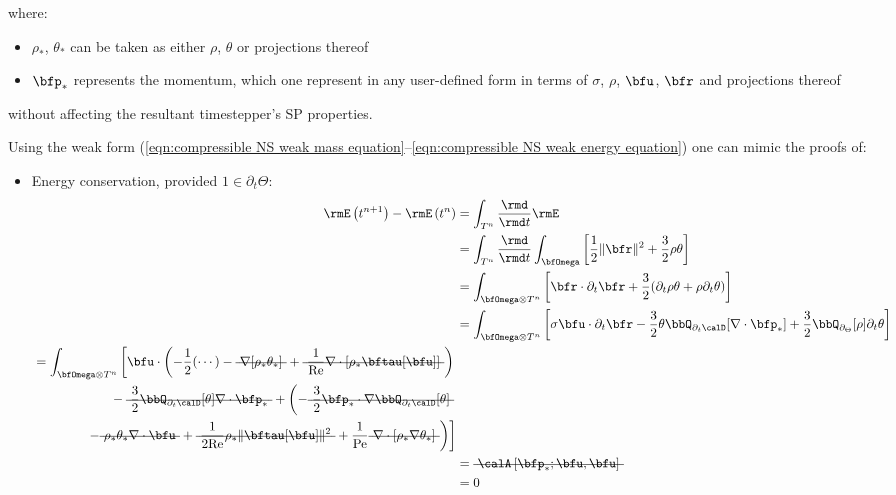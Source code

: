     where:
    \begin{itemize}
        \item  $\rho_{*}$, $\theta_{*}$ can be taken as either $\rho$, $\theta$ or projections thereof
        \item  $\bfp_{*}$ represents the momentum, which one represent in any user-defined form in terms of $\sigma$, $\rho$, $\bfu$, $\bfr$ and projections thereof
    \end{itemize}
    without affecting the resultant timestepper's SP properties.

    \line

    Using the weak form (\ref{eqn:compressible NS weak mass equation}--\ref{eqn:compressible NS weak energy equation}) one can mimic the proofs of:
    \begin{itemize}
        \item  Energy conservation, provided $1 \in \partial_{t}\Theta$:
        \begin{align}
                \rmE\left(t^{n + 1}\right) - \rmE\left(t^{n}\right)
                &=  \int_{T^{n}}\frac{\rmd}{\rmd t}\rmE  \\
                &=  \int_{T^{n}}\frac{\rmd}{\rmd t}\int_{\bfOmega}\left[\frac{1}{2}\|\bfr\|^{2} + \frac{3}{2}\rho\theta\right]  \\
                &=  \int_{\bfOmega\otimes T^{n}}\left[\bfr\cdot\partial_{t}\bfr + \frac{3}{2}(\partial_{t}\rho\theta + \rho\partial_{t}\theta)\right]  \\
                &=  \int_{\bfOmega\otimes T^{n}}\left[\sigma\bfu\cdot\partial_{t}\bfr - \frac{3}{2}\theta\bbQ_{\partial_{t}\calD}[\nabla\cdot\bfp_{*}] + \frac{3}{2}\bbQ_{\partial_{\Theta}}[\rho]\partial_{t}\theta\right]  \\
            \begin{split}
                &=  \int_{\bfOmega\otimes T^{n}}\left[\bfu\cdot\left(- \frac{1}{2}(\cdots) - \mst{\nabla[\rho_{*}\theta_{*}]} + \mst{\frac{1}{\rmRe}\nabla\cdot[\rho_{*}\bftau[\bfu]]}\right)\right.  \\
                &\qquad\qquad\qquad- \mst{\frac{3}{2}\bbQ_{\partial_{t}\calD}[\theta]\nabla\cdot\bfp_{*}} + \left(- \mst{\frac{3}{2}\bfp_{*}\cdot\nabla\bbQ_{\partial_{t}\calD}[\theta]}\right.  \\
                &\qquad\qquad\left.\left.- \mst{\rho_{*}\theta_{*}\nabla\cdot\bfu} + \mst{\frac{1}{2\rmRe}\rho_{*}\|\bftau[\bfu]\|^{2}} + \frac{1}{\rmPe}\mst{\nabla\cdot[\rho_{*}\nabla\theta_{*}]}\right)\right]
            \end{split}  \\
                &=  \mst{\calA\left[\bfp_{*}; \bfu, \bfu\right]}  \\
                &=  0
        \end{align}


\end{itemize}
